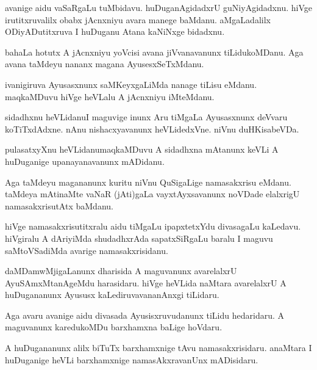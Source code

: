 \begin{mng}
avanige aidu vaSaRgaLu tuMbidavu. huDuganAgidadxrU guNiyAgidadxnu. hiVge irutitxruvalilx obabx jAcnxniyu avara manege baMdanu. aMgaLadalilx ODiyADutitxruva I huDuganu Atana kaNiNxge bidadxnu.
\end{mng}

\begin{mng}
bahaLa hotutx A jAcnxniyu yoVcisi avana jiVvanavanunx tiLidukoMDanu. Aga avana taMdeyu nananx magana AyusesxSeTxMdanu.
\end{mng}

\begin{mng}
ivanigiruva Ayusasxnunx saMKeyxgaLiMda nanage tiLisu eMdanu. maqkaMDuvu hiVge heVLalu A jAcnxniyu iMteMdanu.
\end{mng}

\begin{mng}
sidadhxnu heVLidanu\mdash I maguvige inunx Aru tiMgaLa Ayusasxnunx deVvaru koTiTxdAdxne. nAnu nishacxyavanunx heVLidedxVne. niVnu duHKisabeVDa.
\end{mng}

\begin{mng}
pulasatxyXnu heVLidanu\mdash maqkaMDuvu A sidadhxna mAtanunx keVLi A huDuganige upanayanavanunx mADidanu.
\end{mng}

\begin{mng}
Aga taMdeyu magananunx kuritu niVnu QuSigaLige namasakxrisu eMdanu. taMdeya mAtinaMte vaNaR (jAti)gaLa vayxtAyxsavanunx noVDade elalxrigU namasakxrisutAtx baMdanu.
\end{mng}

\begin{mng}
hiVge namasakxrisutitxralu aidu tiMgaLu ipapxtetxYdu divasagaLu kaLedavu. hiVgiralu A dAriyiMda shudadhxrAda sapatxSiRgaLu baralu I maguvu saMtoVSadiMda avarige namasakxrisidanu.
\end{mng}

\begin{mng}
daMDamwMjigaLanunx dharisida A maguvanunx avarelalxrU AyuSAmxMtanAgeMdu harasidaru. hiVge heVLida naMtara avarelalxrU A huDugananunx Ayususx kaLediruvavananAnxgi tiLidaru.
\end{mng}

\begin{mng}
Aga avaru avanige aidu divasada Ayusisxruvudanunx tiLidu hedaridaru. A maguvanunx karedukoMDu barxhamxna baLige hoVdaru.
\end{mng}

\begin{mng}
A huDugananunx alilx biTuTx barxhamxnige tAvu namasakxrisidaru. anaMtara I huDuganige heVLi barxhamxnige namasAkxravanUnx mADisidaru.
\end{mng}

